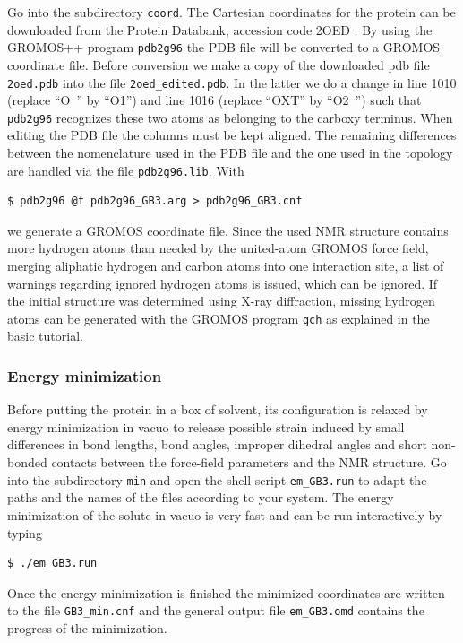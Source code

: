 Go into the subdirectory \texttt{coord}. The Cartesian coordinates for the protein can be downloaded from the Protein Databank, accession code 2OED \cite{Ulmer_2003}. By using the GROMOS++ program \texttt{pdb2g96} the PDB file will be converted to a GROMOS coordinate file. Before conversion we make a copy of the downloaded pdb file \texttt{2oed.pdb} into the file \texttt{2oed\_edited.pdb}. In the latter we do a change in line 1010 (replace “O~” by “O1”) and line 1016 (replace “OXT” by “O2~”) such that \texttt{pdb2g96} recognizes these two atoms as belonging to the carboxy terminus. When editing the PDB file the columns must be kept aligned. The remaining differences between the nomenclature used in the PDB file and the one used in the topology are handled via the file \texttt{pdb2g96.lib}. With
\begin{lstlisting}
$ pdb2g96 @f pdb2g96_GB3.arg > pdb2g96_GB3.cnf
\end{lstlisting}
we generate a GROMOS coordinate file. 
Since the used NMR structure contains more hydrogen atoms than needed by the united-atom GROMOS force field, merging aliphatic hydrogen and carbon atoms into one interaction site, 
a list of warnings regarding ignored hydrogen atoms is issued, which can be ignored. If the initial structure was determined using X-ray diffraction, missing hydrogen atoms can be generated 
with the GROMOS program \texttt{gch} as explained in the basic tutorial.

\subsubsection{Energy minimization}

Before putting the protein in a box of solvent, its configuration is relaxed by energy minimization 
in vacuo to release possible strain induced by small differences in bond lengths, bond angles, improper dihedral angles and short non-bonded contacts 
between the force-field parameters and the NMR structure.
Go into the subdirectory \texttt{min} and open the shell script \texttt{em\_GB3.run} to adapt the paths and the names of the files according to your system. 
The energy minimization of the solute in vacuo is very fast and can be run interactively by typing
\begin{lstlisting}
$ ./em_GB3.run
\end{lstlisting}
Once the energy minimization is finished the minimized coordinates are written to the file \texttt{GB3\_min.cnf} and the general output file \texttt{em\_GB3.omd} contains the progress of the minimization.

